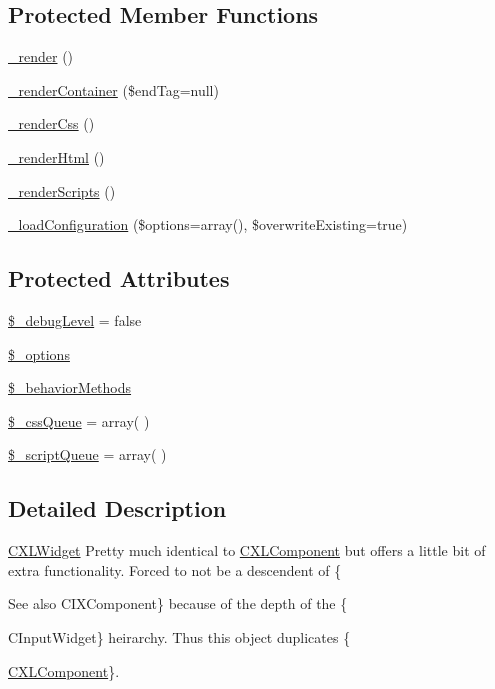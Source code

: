 \subsection*{Protected Member Functions}
\begin{DoxyCompactItemize}
\item 
\hyperlink{classCXLWidget_a30bcc620a40b8f755dbafb28ff1c76d4}{\_\-render} ()
\item 
\hyperlink{classCXLWidget_a13868aafdf32adbae02f5a6f67b09a85}{\_\-renderContainer} (\$endTag=null)
\item 
\hyperlink{classCXLWidget_ab5306e10e3f9f19a140e41c511ff4418}{\_\-renderCss} ()
\item 
\hyperlink{classCXLWidget_a4aaa4a2e6a8c23d1271f20ba8825b74f}{\_\-renderHtml} ()
\item 
\hyperlink{classCXLWidget_a5b1cb053d8f49692a780a713a6f13f13}{\_\-renderScripts} ()
\item 
\hyperlink{classCXLWidget_a8a846a2258df8a7ec499ede2d3fe518b}{\_\-loadConfiguration} (\$options=array(), \$overwriteExisting=true)
\end{DoxyCompactItemize}
\subsection*{Protected Attributes}
\begin{DoxyCompactItemize}
\item 
\hyperlink{classCXLWidget_a6c76d7fa9253beae006eaaf4e3038ce9}{\$\_\-debugLevel} = false
\item 
\hyperlink{classCXLWidget_a1bebdc689c84eee59ad24c77e5531762}{\$\_\-options}
\item 
\hyperlink{classCXLWidget_ac1d32c0491955b7c0648ab9a304c45c0}{\$\_\-behaviorMethods}
\item 
\hyperlink{classCXLWidget_a5766011bef2f45b3f312fd6cc1525bf7}{\$\_\-cssQueue} = array( )
\item 
\hyperlink{classCXLWidget_a91cbf6ff0a073181fb836b51b0b781ac}{\$\_\-scriptQueue} = array( )
\end{DoxyCompactItemize}


\subsection{Detailed Description}
\hyperlink{classCXLWidget}{CXLWidget} Pretty much identical to \hyperlink{classCXLComponent}{CXLComponent} but offers a little bit of extra functionality. Forced to not be a descendent of \{\begin{DoxySeeAlso}{See also}
CIXComponent\} because of the depth of the \{

CInputWidget\} heirarchy. Thus this object duplicates \{

\hyperlink{classCXLComponent}{CXLComponent}\}. 
\end{DoxySeeAlso}


